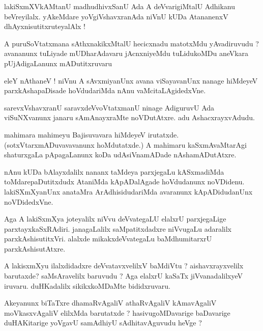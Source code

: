 \documentclass{article}
\begin{document}
\begin{mn}%
lakiSxmXVkAMtanU madhudhivxSanU Ada A deVvarigiMtalU Adhikanu beVreyilalx. yAkeMdare 
yoVgiVshavxranAda niVnU kUDa AtananenxV dhAyxnisutitxruteyalAlx !
\end{mn}

\begin{mn}%
A puruSoVtatxmana sAthxnakikxMtalU hecicxnadu matotxMdu yAvadiruvudu ? avananunx tuLiyade 
mUDharAdavaru jAcnxniyeMdu  tuLidukoMDu aneVkara pUjAdigaLanunx mADutitxruvaru
\end{mn}

\begin{mn}%
eleY nAthaneV ! niVnu A sAvxmiyanUnx avana viSayavanUnx nanage hiMdeyeV parxkAshapaDisade 
hoVdudariMda nAnu vaMcitaLAgidedxVne.
\end{mn}

\begin{mn}%
sarevxVshavxranU saravxdeVvoVtatxmanU ninage AdiguruvU Ada viSuNXvanunx janaru sAmAnayxraMte 
noVDutAtxre. adu AshacxrayxvAdudu.
\end{mn}

\begin{mn}%
mahimara mahimeyu Bajisuvavara hiMdeyeV irutatxde. (sotxVtarxmADuvavavanunx hoMdutatxde.) A 
mahimaru kaSxmAvaMtarAgi shaturxgaLa pApagaLanunx koDa udAsiVnamADade nAshamADutAtxre.
\end{mn}

\begin{mn}%
nAnu kUDa bAlayxdalilx nananx taMdeya parxjegaLu kASxmadiMda toMdarepaDutitxdudx AtaniMda 
kApADalAgade hoVdudanunx noVDidenu. lakiSXmXyanUnx anataMra ArAdhisidudariMda avaranunx 
kApADidudanUnx noVDidedxVne.
\end{mn}

\begin{mn}%
Aga A lakiSxmXya joteyalilx niVvu deVvategaLU elalxrU parxjegaLige parxtayxkaSxRAdiri. janagaLalilx 
saMpatitxdadxre niVvugaLu adaralilx parxkAshisutitxVri. alalxde mikakxdeVvategaLu baMdhumitarxrU 
parxkAshisutAtxre.
\end{mn}

\begin{mn}%
A lakisxmXyu ilalxdidadxre deVvatavxvelilxV baMdiVtu ? aishavxrayxvelilx barutaxde? saMsAravelilx 
baruvudu ? Aga elalxrU kaSaTx jiVvanadalilxyeV iruvaru. duHKadalilx sikikxkoMDaMte bididxruvaru.
\end{mn}

\begin{mn}%
Akeyanunx biTaTxre dhamaRvAgaliV athaRvAgaliV kAmavAgaliV moVkasxvAgaliV elilxMda barutatxde ? 
hasivugoMDavarige baDavarige duHAKitarige yoVgavU samAdhiyU sAdhitavAguvudu heVge ?
\end{mn}
\end{document}
